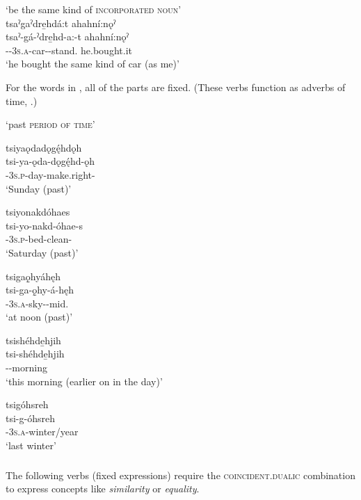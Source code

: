 \ea\label{ex:pppexpressionex32}  ‘be the same kind of \textsc{incorporated noun}’\\
tsaˀgaˀdre̱hdá:t ahahní:nǫˀ\\
\gll tsaˀ-gá-ˀdre̱hd-a:-t ahahní:nǫˀ\\
{\coincident}-{\factual}-\textsc{3s.a}-car-{\joinerA}-stand.{\stative} he.bought.it\\
\glt `he bought the same kind of car (as me)’
\z


For the words in , all of the parts are fixed. (These verbs function as adverbs of time, .)

\ea\label{ex:tsiex3}  ‘past \textsc{period of time}’

\ea tsiyaǫdadǫgę́hdǫh\\
\gll tsi-ya-ǫda-dǫgę́hd-ǫh\\
{\coincident}-\textsc{3s.p}-day-make.right-{\stative}\\
\glt `Sunday (past)'

\ex tsiyonakdóhaes\\
\gll tsi-yo-nakd-óhae-s\\
{\coincident}-\textsc{3s.p}-bed-clean-{\habitual}\\
\glt `Saturday (past)'

\ex tsigaǫ̱hyáhęh\\
\gll tsi-ga-ǫ̱hy-á-hęh\\
{\coincident}-\textsc{3s.a}-sky-{\joinerA}-mid.{\stative}\\
\glt `at noon (past)'

\ex tsishéhde̱hjih\\
\gll tsi-shéhde̱hjih\\
{\coincident}--morning\\
\glt `this morning (earlier on in the day)'

\newpage
\ex tsigóhsreh\\
\gll tsi-g-óhsreh\\
{\coincident}-\textsc{3s.a}-winter/year\\
\glt `last winter'
\z
\z


\subsubsection*{} \label{[tsaˀde-verb]}
The following verbs (fixed expressions) require the  \textsc{coincident.dualic} combination to express concepts like \textit{similarity} or \textit{equality}. 


